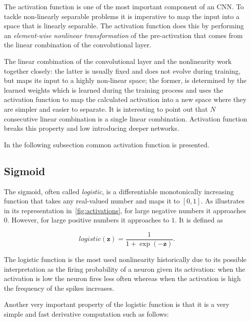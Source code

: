 The activation function is one of the most important component of an CNN. To tackle non-linearly separable problems it is imperative to map the input into a space that is linearly separable. The activation function does this by performing an \emph{element-wise nonlinear transformation} of the pre-activation that comes from the linear combination of the convolutional layer.

The linear combination of the convolutional layer and the nonlinearity work together closely: the latter is usually fixed and does not evolve during training, but maps its input to a highly non-linear space; the former, is determined by the learned weights which is learned during the training process and uses the activation function to map the calculated activation into a new space where they are simpler and easier to separate. It is interesting to point out that $N$ consecutive linear combination is a single linear combination. Activation function breaks this property and low introducing deeper networks.

In the following subsection common activation function is presented.

\subsection{Sigmoid}\label{sec:logistic}
The sigmoid, often called \emph{logistic}, is a differentiable monotonically
increasing function that takes any real-valued number and maps it to $[0, 1]$.
As illustrates in its representation in~\ref{fig:activations}, for large
negative numbers it approaches $0$. However, for large positive numbers it
approaches to $1$. It is defined as

\begin{equation}\label{eq:logistic}
    logistic(\mathbf{z}) = \frac{1}{1+\exp(-\mathbf{z})}.
\end{equation}

\noindent The logistic function is the most used nonlinearity historically due to its possible interpretation as the firing probability of a neuron given its activation: when the activation is low the neuron fires less often whereas when the activation is high the frequency of the spikes increases.

Another very important property of the logistic function is that it is a very
simple and fast derivative computation such as follows:

